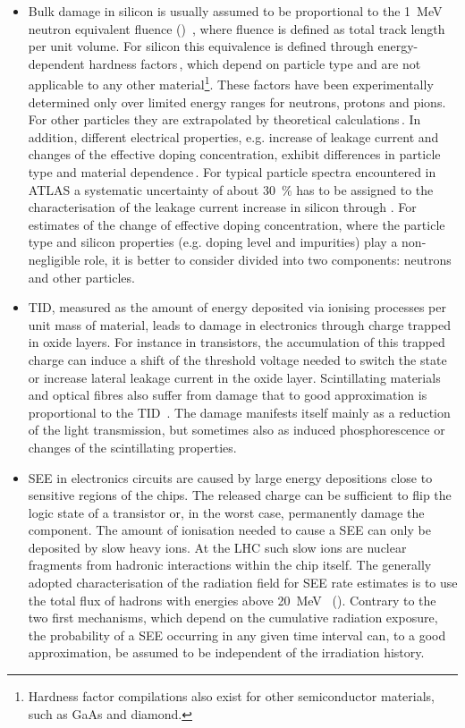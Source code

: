 \documentclass[cernpreprint, atlasdraft=false, UKenglish,british,orcidlogo, texmf, orcidlogo]{atlasdoc}
\begin{document}
\begin{itemize}
\item Bulk damage in silicon is usually assumed to be proportional to the \SI{1}{MeV} neutron equivalent
fluence (\phieqv)~\cite{summers87}, where fluence is defined as total track length per unit volume.
For silicon this equivalence is defined through energy-dependent hardness factors\,\cite{moll-TNS65:1561}, which depend on particle type and are not applicable to any
other material\footnote{Hardness factor compilations also exist for other semiconductor materials, such as GaAs and diamond.}.
These factors have been experimentally
determined only over limited energy ranges for neutrons, protons and pions. For other particles
they are extrapolated by theoretical calculations\,\cite{huhtinen-nim335:580, huhtinen-nim491:194}.
In addition, different electrical properties, e.g. increase of leakage current and changes of the effective doping concentration, exhibit differences in particle type and material
dependence\,\cite{moll-TNS65:1561}.
For typical particle spectra encountered in ATLAS a systematic uncertainty of about \SI{30}{\percent} has to
be assigned to the characterisation of the leakage current increase in silicon through \phieqv.
For estimates of the change of effective doping concentration,
where the particle type and silicon properties (e.g. doping level and impurities) play a non-negligible role, it is better to consider
\phieqv divided into two components:  neutrons and other particles.
\item \gls{TID}, measured as the amount of energy deposited via ionising processes
per unit mass of material, leads to damage in electronics through charge trapped in oxide layers.
For instance in transistors, the accumulation of this trapped charge can induce a shift of the threshold voltage needed to switch the state
or increase lateral leakage current in the oxide layer. Scintillating materials and optical
fibres also suffer from damage that to good approximation is proportional to the \gls{TID}~\cite{ZHU1998297}.
The damage manifests itself mainly as a reduction of the light transmission, but sometimes also as induced
phosphorescence or changes of the scintillating properties.
\item \gls{SEE} in electronics circuits are caused by large energy depositions
close to sensitive regions of the chips. The released charge can be sufficient to flip the logic state
of a transistor or, in the worst case, permanently damage the component.
The amount of ionisation needed to cause a \gls{SEE} can only be deposited by slow heavy ions.
At the \gls{LHC} such slow ions are nuclear fragments from hadronic interactions within the chip itself. The
generally adopted characterisation of the radiation field for \gls{SEE} rate estimates is to use the total
flux of hadrons with energies above \SI{20}{\MeV}~\cite{huhtinen-nim450:155} (\phiSEU). Contrary to the two first
mechanisms, which depend on the cumulative radiation exposure, the probability of a \gls{SEE} occurring in
any given time interval can, to a good approximation, be assumed to be independent of the irradiation
history.
\end{itemize}
 
\end{document}
